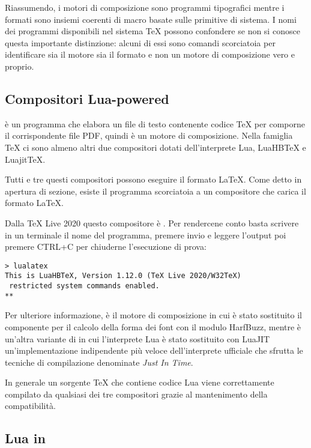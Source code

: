 Riassumendo, i motori di composizione sono programmi tipografici mentre i
formati sono insiemi coerenti di macro basate sulle primitive di sistema. I
nomi dei programmi disponibili nel sistema \TeX{} possono confondere se non si
conosce questa importante distinzione: alcuni di essi sono comandi scorciatoia
per identificare sia il motore sia il formato e non un motore di composizione
vero e proprio.


\subsection{Compositori Lua-powered}

\LuaTeX{} è un programma che elabora un file di testo contenente codice \TeX{}
per comporne il corrispondente file PDF, quindi è un motore di composizione.
Nella famiglia \TeX{} ci sono almeno altri due compositori dotati
dell'interprete Lua, LuaHB\TeX{} e Luajit\TeX{}.

Tutti e tre questi compositori possono eseguire il formato \LaTeX. Come detto in
apertura di sezione, esiste il programma  scorciatoia a un
compositore che carica il formato \LaTeX.

Dalla TeX Live 2020 questo compositore è . Per rendercene conto
basta scrivere in un terminale il nome del programma, premere invio e leggere
l'output poi premere CTRL+C per chiuderne l'esecuzione di prova:
\begin{Verbatim}
> lualatex
This is LuaHBTeX, Version 1.12.0 (TeX Live 2020/W32TeX)
 restricted system commands enabled.
**
\end{Verbatim}

Per ulteriore informazione,  è il motore di composizione
 in cui è stato sostituito il componente per il calcolo della
forma dei font con il modulo HarfBuzz, mentre  è un'altra
variante di  in cui l'interprete Lua è stato sostituito con
LuaJIT un'implementazione indipendente più veloce dell'interprete ufficiale che
sfrutta le tecniche di compilazione denominate \emph{Just In Time}.

In generale un sorgente \TeX{} che contiene codice Lua viene correttamente
compilato da qualsiasi dei tre compositori grazie al mantenimento della
compatibilità.


\subsection{Lua in \LuaTeX}

